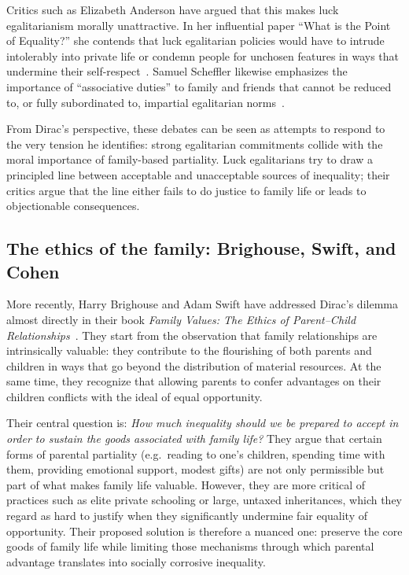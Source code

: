 \documentclass[%
  reprint,
  superscriptaddress,
  amsmath,amssymb,
  pra,
  floatfix,
  longbibliography
]{revtex4-2}
\begin{document}
Critics such as Elizabeth Anderson have argued that this makes
luck egalitarianism morally unattractive.  In her influential paper
``What is the Point of Equality?'' she contends that luck egalitarian
policies would have to intrude intolerably into private life or condemn
people for unchosen features in ways that undermine their
self-respect~\cite{Anderson1999}.  Samuel Scheffler likewise emphasizes
the importance of ``associative duties'' to family and friends that
cannot be reduced to, or fully subordinated to, impartial
egalitarian norms~\cite{Scheffler2001}.

From Dirac's perspective, these debates can be seen as attempts to
respond to the very tension he identifies: strong egalitarian
commitments collide with the moral importance of family-based
partiality.  Luck egalitarians try to draw a principled line between
acceptable and unacceptable sources of inequality; their critics argue
that the line either fails to do justice to family life or leads to
objectionable consequences.

\subsection{The ethics of the family: Brighouse, Swift, and Cohen}

More recently, Harry Brighouse and Adam Swift have addressed Dirac's
dilemma almost directly in their book \emph{Family Values: The Ethics
of Parent--Child Relationships}~\cite{BrighouseSwift2014}.
They start from the observation that family relationships are
intrinsically valuable: they contribute to the flourishing of both
parents and children in ways that go beyond the distribution of
material resources.  At the same time, they recognize that allowing
parents to confer advantages on their children conflicts with the
ideal of equal opportunity.

Their central question is: \emph{How much inequality should we be
prepared to accept in order to sustain the goods associated with
family life?}  They argue that certain forms of parental partiality
(e.g.\ reading to one's children, spending time with them, providing
emotional support, modest gifts) are not only permissible but part of
what makes family life valuable.  However, they are more critical of
practices such as elite private schooling or large, untaxed
inheritances, which they regard as hard to justify when they
significantly undermine fair equality of opportunity.  Their proposed
solution is therefore a nuanced one: preserve the core goods of family
life while limiting those mechanisms through which parental advantage
translates into socially corrosive inequality.
\end{document}

